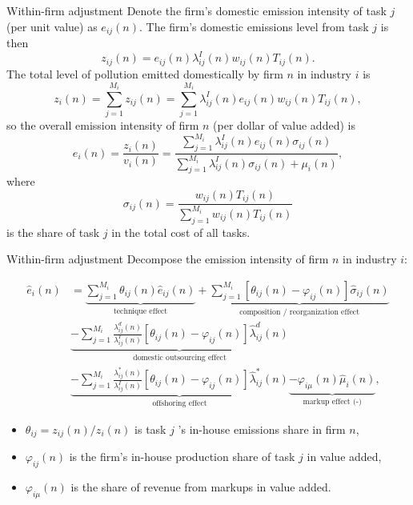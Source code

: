 \documentclass{beamer}
\begin{document}
\begin{frame}{Within-firm adjustment}
	Denote the firm's domestic emission intensity of task $j$ (per unit value) as $e_{ij}(n)$. The firm's domestic emissions level from task $j$ is then
	\begin{equation}
		z_{ij}(n) = e_{ij}(n)\lambda_{ij}^I(n)w_{ij}(n)T_{ij}(n).
	\end{equation}
	The total level of pollution emitted domestically by firm $n$ in industry $i$ is
	\begin{equation}
		z_i(n)=\sum_{j=1}^{M_i}z_{ij}(n)=\sum_{j=1}^{M_i}\lambda_{ij}^I(n)e_{ij}(n)w_{ij}(n)T_{ij}(n),
	\end{equation}
	so the overall emission intensity of firm $n$ (per dollar of value added) is
	\begin{equation}
		e_i(n)=\frac{z_i(n)}{v_i(n)}=\frac{\sum_{j=1}^{M_i}\lambda_{ij}^I(n)e_{ij}(n)\sigma_{ij}(n)}{\sum_{j=1}^{M_i}\lambda_{ij}^I(n)\sigma_{ij}(n)+\mu_i(n)},
	\end{equation}
	where
	\begin{equation}
		\sigma_{ij}(n) = \frac{w_{ij}(n)T_{ij}(n)}{\sum_{j=1}^{M_i}w_{ij}(n)T_{ij}(n)}
	\end{equation}
	is the share of task $j$ in the total cost of all tasks.
\end{frame}
\begin{frame}{Within-firm adjustment}
	Decompose the emission intensity of firm $n$ in industry $i$:
	\begin{small}
		\begin{equation}
			\begin{aligned}
				\hat{e}_i(n)&=\underbrace{ \sum_{j=1}^{M_i}\theta_{ij}(n)\hat{e}_{ij}(n)}_{\text{technique effect}} + \underbrace{\sum_{j=1}^{M_i}[\theta_{ij}(n)-\varphi_{ij}(n)]\hat{\sigma}_{ij}(n)}_{\text{composition / reorganization effect}} \\
				&\underbrace{-\sum_{j=1}^{M_i}\frac{\lambda_{ij}^d(n)}{\lambda_{ij}^I(n)}[\theta_{ij}(n)-\varphi_{ij}(n)]\hat{\lambda}_{ij}^d(n)}_{\text{domestic outsourcing effect}} \\
				&\underbrace{-\sum_{j=1}^{M_i}\frac{\lambda_{ij}^*(n)}{\lambda_{ij}^I(n)}[\theta_{ij}(n)-\varphi_{ij}(n)]\hat{\lambda}_{ij}^*(n)}_{\text{offshoring effect}} \underbrace{-\varphi_{i\mu}(n)\hat{\mu}_i(n)}_{\text{markup effect (-)}},
			\end{aligned}
		\end{equation}
	\end{small}
	\begin{itemize}
		\item $\theta_{ij}=z_{ij}(n)/z_i(n)$ is task $j$ 's in-house emissions share in firm $n$,
		\item $\varphi_{ij}(n)$ is the firm's in-house production share of task $j$ in value added,
		\item $\varphi_{i\mu}(n)$ is the share of revenue from markups in value added.
	\end{itemize}
\end{frame}
\end{document}
